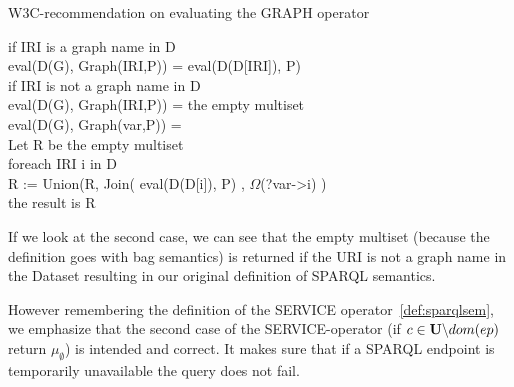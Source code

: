 			\begin{algorithm}
				\caption{W3C-recommendation on evaluating the GRAPH operator}
			if IRI is a graph name in D\\
				\quad eval(D(G), Graph(IRI,P)) = eval(D(D[IRI]), P)\\
			if IRI is not a graph name in D\\
				\quad eval(D(G), Graph(IRI,P)) = the empty multiset\\
				\quad eval(D(G), Graph(var,P)) =\\
			Let R be the empty multiset\\
				\quad foreach IRI i in D\\
					\qquad R := Union(R, Join( eval(D(D[i]), P) , $\Omega$(?var->i) )\\
			the result is R
		\end{algorithm}

			If we look at the second case, we can see that the empty multiset (because the
			definition goes with bag semantics)
			is returned if the URI is not a graph name in the Dataset resulting
			in our original definition of SPARQL semantics. 
			
			However remembering the definition of the SERVICE
			operator~\ref{def:sparqlsem}, we emphasize
			that the second case of the SERVICE-operator (if $c \in \mathbf{U} \backslash
			dom(ep)$ return $\mu_\emptyset$) is intended and correct. It makes
			sure that if a SPARQL endpoint is temporarily unavailable the query
			does not fail.
			

